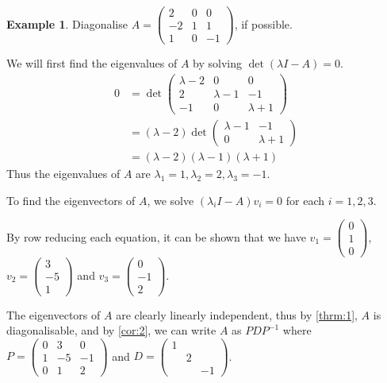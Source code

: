 \documentclass[a4paper]{article}
\theoremstyle{plain}
\theoremstyle{definition}
\newtheorem{example}[theorem]{Example}
\begin{document}
\begin{example}
	Diagonalise $A=\begin{pmatrix}2&0&0\\-2&1&1\\1&0&-1\end{pmatrix}$, if possible.

	We will first find the eigenvalues of $A$ by solving $\det(\lambda I - A)=0$.
	\begin{align*}
		0 & =\det\begin{pmatrix}\lambda-2&0&0\\2&\lambda-1&-1\\-1&0&\lambda+1\end{pmatrix} \\
		  & =(\lambda-2)\det\begin{pmatrix}\lambda-1&-1\\0&\lambda+1\end{pmatrix}          \\
		  & =(\lambda-2)(\lambda-1)(\lambda+1)
	\end{align*}
	Thus the eigenvalues of $A$ are $\lambda_1=1,\lambda_2=2,\lambda_3=-1$.

	To find the eigenvectors of $A$, we solve $(\lambda_i I - A)v_i=0$ for each $i=1,2,3$.

	By row reducing each equation, it can be shown that we have $v_1=\begin{pmatrix}0\\1\\0\end{pmatrix}$,
	$v_2=\begin{pmatrix}3\\-5\\1\end{pmatrix}$ and $v_3=\begin{pmatrix}0\\-1\\2\end{pmatrix}$.

	The eigenvectors of $A$ are clearly linearly independent, thus by \ref{thrm:1}, $A$ is diagonalisable, and by \ref{cor:2},
	we can write $A$ as $PDP^{-1}$ where $P=\begin{pmatrix}0&3&0\\1&-5&-1\\0&1&2\end{pmatrix}$ and $D=\begin{pmatrix}1&&\\&2&\\&&-1\end{pmatrix}$.
\end{example}
\newpage
\end{document}
